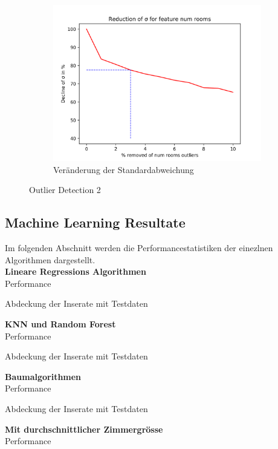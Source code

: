 \begin{figure}[h]
\begin{subfigure}{.5\textwidth}
  \includegraphics[width=\linewidth]{images/anhang/outlier_detection/num_rooms_std.png}
  \caption{Veränderung der Standardabweichung} 
\end{subfigure}
\caption{Outlier Detection 2}
\end{figure}

\clearpage
\subsection{Machine Learning Resultate}
Im folgenden Abschnitt werden die Performancestatistiken der einezlnen Algorithmen dargestellt.\\[2ex]
\textbf{Lineare Regressions Algorithmen}\\
Performance


Abdeckung der Inserate mit Testdaten


%
\newpage
\textbf{KNN und Random Forest}\\
Performance


Abdeckung der Inserate mit Testdaten


%
\newpage
\textbf{Baumalgorithmen}\\
Performance


Abdeckung der Inserate mit Testdaten


%
\newpage
\textbf{Mit durchschnittlicher Zimmergrösse}\\
Performance

